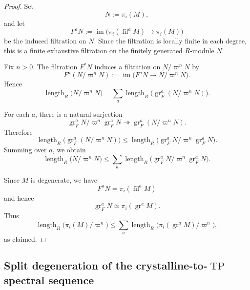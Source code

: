 \documentclass[11pt]{amsart}
\numberwithin{equation}{section}
\newcommand{\len}{\operatorname{length}}
\newcommand{\gr}{{\operatorname{gr}}}
\newcommand{\fil}{{\operatorname{fil}}}
\numberwithin{equation}{section}
\newcommand{\TP}{\operatorname{TP}}
\begin{document}
\begin{proof}
Set
\begin{equation*}
  N:=\pi_i(M),
\end{equation*}
and let
\begin{equation*}
  F^aN:=
  \operatorname{im}\bigl(\pi_i(\fil^a M)\to \pi_i(M)\bigr)
\end{equation*}
be the induced filtration on $N$.
Since the filtration is locally finite in each degree, this is a finite
exhaustive filtration on the finitely generated $R$-module $N$.

Fix $n>0$. The filtration $F^* N$ induces a filtration on
$N/\varpi^nN$ by
\begin{equation*}
  F^a(N/\varpi^nN):=
  \operatorname{im}\bigl(F^aN\to N/\varpi^nN\bigr).
\end{equation*}
Hence
\begin{equation*}
  \len_R\bigl(N/\varpi^nN\bigr)
  =
  \sum_a
  \len_R\bigl(\gr_F^a(N/\varpi^nN)\bigr).
\end{equation*}

For each $a$, there is a natural surjection
\begin{equation*}
  \gr_F^a N/\varpi^n \gr_F^a N
  \twoheadrightarrow
  \gr_F^a(N/\varpi^nN).
\end{equation*}
Therefore
\begin{equation*}
  \len_R\bigl(\gr_F^a(N/\varpi^nN)\bigr)
  \leq
  \len_R\bigl(\gr_F^a N/\varpi^n \gr_F^a N\bigr).
\end{equation*}
Summing over $a$, we obtain
\begin{equation*}
  \len_R\bigl(N/\varpi^nN\bigr)
  \leq
  \sum_a
  \len_R\bigl(\gr_F^a N/\varpi^n \gr_F^a N\bigr).
\end{equation*}

Since $M$ is degenerate, we have
\begin{equation*}
  F^aN=\pi_i(\fil^aM)
\end{equation*}
and hence
\begin{equation*}
  \gr_F^aN \simeq \pi_i(\gr^aM).
\end{equation*}
Thus
\begin{equation*}
  \len_R\bigl(\pi_i(M)/\varpi^n\bigr)
  \leq
  \sum_a
  \len_R\bigl(\pi_i(\gr^aM)/\varpi^n\bigr),
\end{equation*}
as claimed.
\end{proof}
\subsection{\texorpdfstring{Split degeneration of the crystalline-to-$\TP$ spectral sequence}{Split degeneration of the crystalline-to-TP spectral sequence}}
\end{document}
